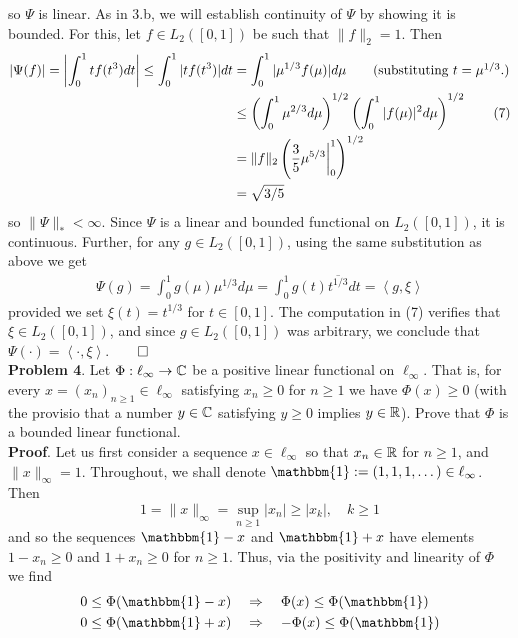\documentclass[10pt]{article}
\newcommand{\1}[1]{\mathbbm{1}_{#1}} \newcommand{\mc}[1]{\mathcal{#1}}
\newcommand{\ip}[2]{\left\langle#1,#2\right\rangle }
\begin{document}
    so $\Psi$ is linear. As in 3.b, we will establish continuity of $\Psi$ by showing it is bounded. For this, let $f\in L_2([0,1])$ be such that $\|f\|_2=1$. Then
    \begin{align*}
        |\Psi(f)|=\left|\int_0^1tf(t^3)dt\right|\leq\int_0^1|tf(t^3)|dt&=\int_0^1|\mu^{1/3} f(\mu)|d\mu\tag{substituting $t=\mu^{1/3}$.}\\
        &\leq\left(\int_0^1\mu^{2/3}d\mu\right)^{1/2}\left(\int_0^1|f(\mu)|^2d\mu\right)^{1/2}\tag{7}\\
        &=\|f\|_2\left(\frac{3}{5}\mu^{5/3}\bigg|^1_0\right)^{1/2}\\
        &=\sqrt{3/5}
    \end{align*}
    so $\|\Psi\|_\ast<\infty$. Since $\Psi$ is a linear and bounded functional on $L_2([0,1])$, it is continuous. Further, for any $g\in L_2([0,1])$, using the same substitution as above we get
    \begin{align*}
        \Psi(g)=\int_0^1g(\mu)\mu^{1/3}d\mu=\int_{0}^{1}g(t)\overline{t^{1/3}}dt=\ip{g}{\xi}
    \end{align*}
    provided we set $\xi(t)=t^{1/3}$ for $t\in[0,1]$. The computation in (7) verifies that $\xi\in L_2([0,1])$, and since $g\in L_2([0,1])$ was arbitrary, we conclude that $\Psi(\cdot)=\ip{\cdot}{\xi}$.\hfill{$\qed$}\\[5pt]
    {\bf Problem 4}. Let $\Phi:\ell_\infty\rightarrow\mathbb{C}$ be a positive linear functional on $\ell_\infty$. That is, for every $x=(x_n)_{n\geq 1}\in\ell_\infty$ satisfying $x_n\geq 0$ for $n\geq 1$ we have
    $\Phi(x)\geq 0$ (with the provisio that a number $y\in\mathbb{C}$ satisfying $y\geq 0$ implies $y\in\mathbb{R}$). Prove that $\Phi$ is a bounded linear functional.\\[5pt]
    {\bf Proof}. Let us first consider a sequence $x\in\ell_\infty$ so that $x_n\in\mathbb{R}$ for $n\geq 1$, and $\|x\|_\infty=1$. Throughout, we shall denote $\mathbbm{1}:=(1,1,1,\dots)\in\ell_\infty$. Then
    \[1=\|x\|_\infty =\sup_{n\geq 1}|x_n|\geq |x_k|,\quad k\geq 1\tag{8}\]
    and so the sequences $\mathbbm{1}-x$ and $\mathbbm{1}+x$ have elements $1-x_n\geq 0$ and $1+x_n\geq 0$  for $n\geq 1$. Thus, via the positivity and linearity of $\Phi$ we find
    \begin{align*}
        0\leq \Phi(\mathbbm{1}-x)\quad&\Rightarrow\quad \Phi(x)\leq \Phi(\mathbbm{1}) \\
        0\leq \Phi(\mathbbm{1}+x)\quad&\Rightarrow\quad -\Phi(x)\leq \Phi(\mathbbm{1})
    \end{align*}
\end{document}
